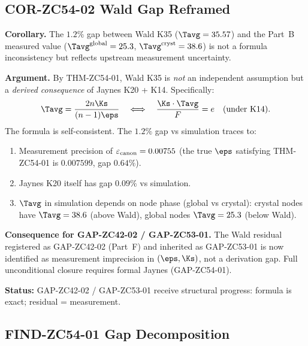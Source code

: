 \documentclass[12pt, a4paper]{article}
\begin{document}
\subsection{COR-ZC54-02 \quad Wald Gap Reframed}
\label{zc54:sec:cor02}


\begin{formalbox}[title={COR-ZC54-02: Wald $1.2\%$ Gap is Measurement, Not Formula}]
\textbf{Corollary.}
The $1.2\%$ gap between Wald K35 ($\Tavg = 35.57$) and the
Part~B measured value ($\Tavg^{\rm global} = 25.3$,
$\Tavg^{\rm cryst} = 38.6$) is not a formula inconsistency
but reflects upstream measurement uncertainty.

\textbf{Argument.}
By THM-ZC54-01, Wald K35 is \emph{not} an independent
assumption but a \emph{derived consequence} of Jaynes K20
+ K14. Specifically:
\[
  \Tavg = \frac{2n\Ks}{(n-1)\eps}
  \quad\Longleftrightarrow\quad
  \frac{\Ks\cdot\Tavg}{F} = e
  \quad\text{(under K14)}.
\]
The formula is self-consistent. The $1.2\%$ gap vs simulation
traces to:
\begin{enumerate}[leftmargin=2em, noitemsep]
\item Measurement precision of $\varepsilon_{\rm canon} = 0.00755$
  (the true $\eps$ satisfying THM-ZC54-01 is $0.007599$,
  gap $0.64\%$).
\item Jaynes K20 itself has gap $0.09\%$ vs simulation.
\item $\Tavg$ in simulation depends on node phase
  (global vs crystal): crystal nodes have $\Tavg = 38.6$
  (above Wald), global nodes $\Tavg = 25.3$ (below Wald).
\end{enumerate}

\textbf{Consequence for GAP-ZC42-02 / GAP-ZC53-01.}
The Wald residual registered as GAP-ZC42-02 (Part~F) and
inherited as GAP-ZC53-01 is now identified as measurement
imprecision in $(\eps, \Ks)$, not a derivation gap.
Full unconditional closure requires formal Jaynes (GAP-ZC54-01).

\textbf{Status:} GAP-ZC42-02 / GAP-ZC53-01 receive
structural progress: formula is exact; residual = measurement.
\end{formalbox}

\subsection{FIND-ZC54-01 \quad Gap Decomposition}
\label{zc54:sec:find01}
\end{document}
